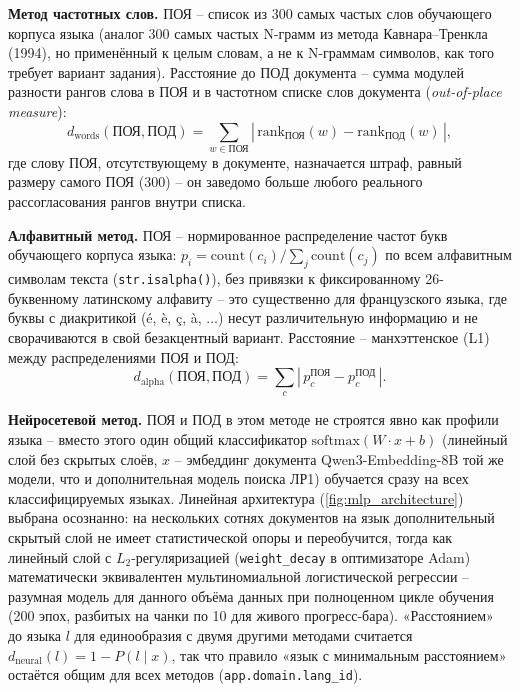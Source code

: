 
\textbf{Метод частотных слов.} ПОЯ -- список из 300 самых частых слов
обучающего корпуса языка (аналог 300 самых частых N-грамм из метода
Кавнара--Тренкла (1994), но применённый к целым словам, а не к
N-граммам символов, как того требует вариант задания). Расстояние до
ПОД документа -- сумма модулей разности рангов слова в ПОЯ и в
частотном списке слов документа (\emph{out-of-place measure}):
\begin{equation}
  d_{\text{words}}(\text{ПОЯ}, \text{ПОД}) = \sum_{w \in \text{ПОЯ}} \left|\, \mathrm{rank}_{\text{ПОЯ}}(w) - \mathrm{rank}_{\text{ПОД}}(w) \,\right|,
\end{equation}
где слову ПОЯ, отсутствующему в документе, назначается штраф, равный
размеру самого ПОЯ (300) -- он заведомо больше любого реального
рассогласования рангов внутри списка.

\textbf{Алфавитный метод.} ПОЯ -- нормированное распределение частот
букв обучающего корпуса языка: $p_i = \mathrm{count}(c_i) / \sum_j \mathrm{count}(c_j)$
по всем алфавитным символам текста (\texttt{str.isalpha()}), без
привязки к фиксированному 26-буквенному латинскому алфавиту -- это
существенно для французского языка, где буквы с диакритикой (é, è, ç,
à, ...) несут различительную информацию и не сворачиваются в свой
безакцентный вариант. Расстояние -- манхэттенское (L1) между
распределениями ПОЯ и ПОД:
\begin{equation}
  d_{\text{alpha}}(\text{ПОЯ}, \text{ПОД}) = \sum_{c} \left|\, p^{\text{ПОЯ}}_c - p^{\text{ПОД}}_c \,\right|.
\end{equation}

\textbf{Нейросетевой метод.} ПОЯ и ПОД в этом методе не строятся явно
как профили языка -- вместо этого один общий классификатор
$\mathrm{softmax}(W \cdot x + b)$ (линейный слой без скрытых слоёв,
$x$ -- эмбеддинг документа Qwen3-Embedding-8B той же модели, что и
дополнительная модель поиска ЛР1) обучается сразу на всех
классифицируемых языках. Линейная архитектура (\autoref{fig:mlp_architecture}) выбрана осознанно: на
нескольких сотнях документов на язык дополнительный скрытый слой не
имеет статистической опоры и переобучится, тогда как линейный слой с
$L_2$-регуляризацией (\texttt{weight\_decay} в оптимизаторе Adam)
математически эквивалентен мультиномиальной логистической регрессии --
разумная модель для данного объёма данных при полноценном цикле
обучения (200 эпох, разбитых на чанки по 10 для живого прогресс-бара).
«Расстоянием» до языка $l$ для единообразия с двумя другими методами
считается $d_{\text{neural}}(l) = 1 - P(l \mid x)$, так что правило
«язык с минимальным расстоянием» остаётся общим для всех методов
(\texttt{app.domain.lang\_id}).


